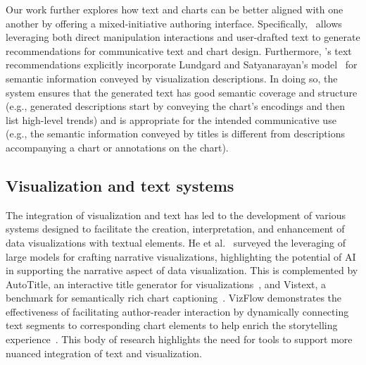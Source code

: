 Our work further explores how text and charts can be better aligned with one another by offering a mixed-initiative authoring interface. Specifically, \pluto~allows leveraging both direct manipulation interactions and user-drafted text to generate recommendations for communicative text and chart design. Furthermore, \pluto's text recommendations explicitly incorporate Lundgard and Satyanarayan's model~\cite{lundgard2021accessible} for semantic information conveyed by visualization descriptions.
In doing so, the system ensures that the generated text has good semantic coverage and structure (e.g., generated descriptions start by conveying the chart's encodings and then list high-level trends) and is appropriate for the intended communicative use (e.g., the semantic information conveyed by titles is different from descriptions accompanying a chart or annotations on the chart).


\subsection{Visualization and text systems}

The integration of visualization and text has led to the development of various systems designed to facilitate the creation, interpretation, and enhancement of data visualizations with textual elements. He et al.~\cite{he2024leveraging} surveyed the leveraging of large models for crafting narrative visualizations, highlighting the potential of AI in supporting the narrative aspect of data visualization. This is complemented by AutoTitle, an interactive title generator for visualizations~\cite{liu2023autotitle}, and Vistext, a benchmark for semantically rich chart captioning~\cite{tang2023vistext}. VizFlow demonstrates the effectiveness of facilitating author-reader interaction by dynamically connecting text segments to corresponding chart elements to help enrich the storytelling experience~\cite{sultanum2021}. This body of research highlights the need for tools to support more nuanced integration of text and visualization.

